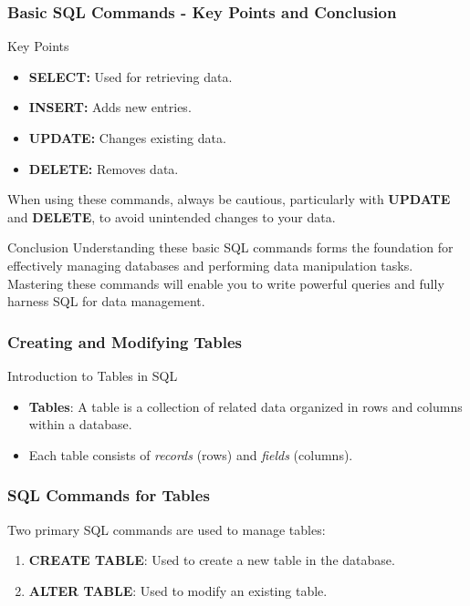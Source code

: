 \documentclass[aspectratio=169]{beamer}
\begin{document}
\begin{frame}[fragile]
    \frametitle{Basic SQL Commands - Key Points and Conclusion}
    \begin{block}{Key Points}
        \begin{itemize}
            \item \textbf{SELECT:} Used for retrieving data.
            \item \textbf{INSERT:} Adds new entries.
            \item \textbf{UPDATE:} Changes existing data.
            \item \textbf{DELETE:} Removes data.
        \end{itemize}
        When using these commands, always be cautious, particularly with \textbf{UPDATE} and \textbf{DELETE}, to avoid unintended changes to your data.
    \end{block}
    
    \begin{block}{Conclusion}
        Understanding these basic SQL commands forms the foundation for effectively managing databases and performing data manipulation tasks. Mastering these commands will enable you to write powerful queries and fully harness SQL for data management.
    \end{block}
\end{frame}

\begin{frame}[fragile]
    \frametitle{Creating and Modifying Tables}
    
    \begin{block}{Introduction to Tables in SQL}
        \begin{itemize}
            \item \textbf{Tables}: A table is a collection of related data organized in rows and columns within a database.
            \item Each table consists of \textit{records} (rows) and \textit{fields} (columns).
        \end{itemize}
    \end{block}
\end{frame}

\begin{frame}[fragile]
    \frametitle{SQL Commands for Tables}
    
    Two primary SQL commands are used to manage tables:
    \begin{enumerate}
        \item \textbf{CREATE TABLE}: Used to create a new table in the database.
        \item \textbf{ALTER TABLE}: Used to modify an existing table.
    \end{enumerate}
\end{frame}
\end{document}

